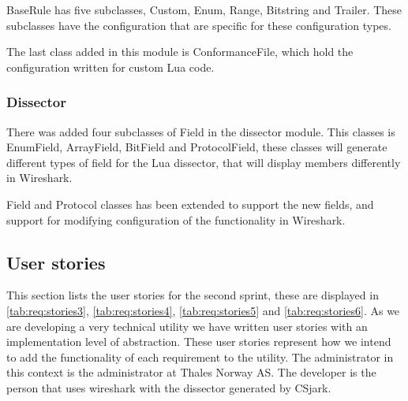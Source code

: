 BaseRule has five subclasses, Custom, Enum, Range, Bitstring and Trailer. 
These subclasses have the configuration that are specific for these 
configuration types.

The last class added in this module is ConformanceFile, which hold the 
configuration written for custom Lua code. 

\subsubsection{Dissector}
There was added four subclasses of Field in the dissector module. This classes 
is EnumField, ArrayField, BitField and ProtocolField, these classes will 
generate different types of field for the Lua dissector, that will display 
members differently in Wireshark.

Field and Protocol classes has been extended to support the new fields, and 
support for modifying configuration of the functionality in Wireshark.

\subsection{User stories}
\label{sec:req:stories2}
This section lists the user stories for the second sprint, these are displayed in \autoref{tab:req:stories3}, \autoref{tab:req:stories4},
\autoref{tab:req:stories5} and \autoref{tab:req:stories6}.
As we are developing a very technical \gls{utility} we have written user stories with an implementation level of abstraction. 
These user stories represent how we intend to add the functionality of each requirement to the \gls{utility}.
The administrator in this context is the administrator at Thales Norway AS. 
The developer is the person that uses \Gls{wireshark} with the \gls{dissector} generated by CSjark.

